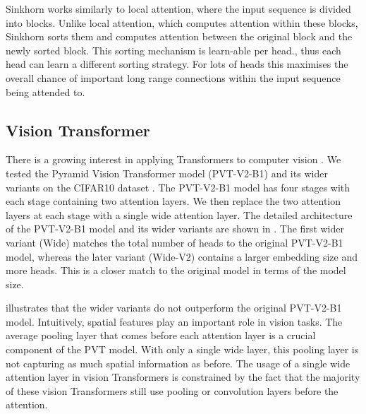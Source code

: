 Sinkhorn works similarly to local attention, where the input sequence is divided into blocks.
Unlike local attention, which computes attention within these blocks, Sinkhorn sorts them and computes attention between the original block and the newly sorted block.
This sorting mechanism is learn-able per head., thus each head can learn a different sorting strategy.
For lots of heads this maximises the overall chance of important long range connections within the input sequence being attended to.


\subsection{Vision Transformer}\label{sec:discussion:vit}

There is a growing interest in applying Transformers to computer vision \citep{wang2021pyramid,wang2022pvt,liu2021swin,dosovitskiy2020image}.
We tested the Pyramid Vision Transformer model (PVT-V2-B1) \citep{wang2022pvt} and its wider variants on the CIFAR10 dataset \citep{krizhevsky2014cifar}.
The PVT-V2-B1 model has four stages with each stage containing two attention layers.
We then replace the two attention layers at each stage with a single wide attention layer.
The detailed architecture of the PVT-V2-B1 model and its wider variants are shown in .
The first wider variant (Wide) matches the total number of heads to the original PVT-V2-B1 model, whereas the later variant (Wide-V2) contains a larger embedding size and more heads.
This is a closer match to the original model in terms of the model size.



 illustrates that the wider variants do not outperform the original PVT-V2-B1 model.
Intuitively, spatial features play an important role in vision tasks.
The average pooling layer that comes before each attention layer is a crucial component of the PVT model.
With only a single wide layer, this pooling layer is not capturing as much spatial information as before.
The usage of a single wide attention layer in vision Transformers is constrained by the fact that the majority of these vision Transformers still use pooling or convolution layers before the attention.

